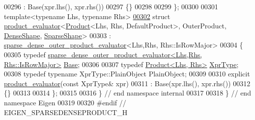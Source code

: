 \begin{DoxyCode}
00296     : Base(xpr.lhs(), xpr.rhs())
00297   \{\}
00298   
00299 \};
00300 
00301 \textcolor{keyword}{template}<\textcolor{keyword}{typename} Lhs, \textcolor{keyword}{typename} Rhs>
\hyperlink{struct_eigen_1_1internal_1_1product__evaluator_3_01_product_3_01_lhs_00_01_rhs_00_01_default_pro2587512d8613ab7eaf4e89d5bc171599}{00302} \textcolor{keyword}{struct }\hyperlink{struct_eigen_1_1internal_1_1product__evaluator}{product\_evaluator}<\hyperlink{group___core___module_class_eigen_1_1_product}{Product}<Lhs, Rhs, DefaultProduct>, OuterProduct, 
      \hyperlink{struct_eigen_1_1_dense_shape}{DenseShape}, \hyperlink{struct_eigen_1_1_sparse_shape}{SparseShape}>
00303   : \hyperlink{struct_eigen_1_1internal_1_1sparse__dense__outer__product__evaluator}{sparse\_dense\_outer\_product\_evaluator}<Lhs,Rhs, Rhs::IsRowMajor>
00304 \{
00305   \textcolor{keyword}{typedef} \hyperlink{struct_eigen_1_1internal_1_1sparse__dense__outer__product__evaluator}{sparse\_dense\_outer\_product\_evaluator<Lhs,Rhs, Rhs::IsRowMajor>}
       \hyperlink{struct_eigen_1_1internal_1_1sparse__dense__outer__product__evaluator}{Base};
00306   
00307   \textcolor{keyword}{typedef} \hyperlink{group___core___module}{Product<Lhs, Rhs>} \hyperlink{group___core___module}{XprType};
00308   \textcolor{keyword}{typedef} \textcolor{keyword}{typename} XprType::PlainObject PlainObject;
00309 
00310   \textcolor{keyword}{explicit} \hyperlink{struct_eigen_1_1internal_1_1product__evaluator}{product\_evaluator}(\textcolor{keyword}{const} XprType& xpr)
00311     : Base(xpr.lhs(), xpr.rhs())
00312   \{\}
00313   
00314 \};
00315 
00316 \} \textcolor{comment}{// end namespace internal}
00317 
00318 \} \textcolor{comment}{// end namespace Eigen}
00319 
00320 \textcolor{preprocessor}{#endif // EIGEN\_SPARSEDENSEPRODUCT\_H}
\end{DoxyCode}
